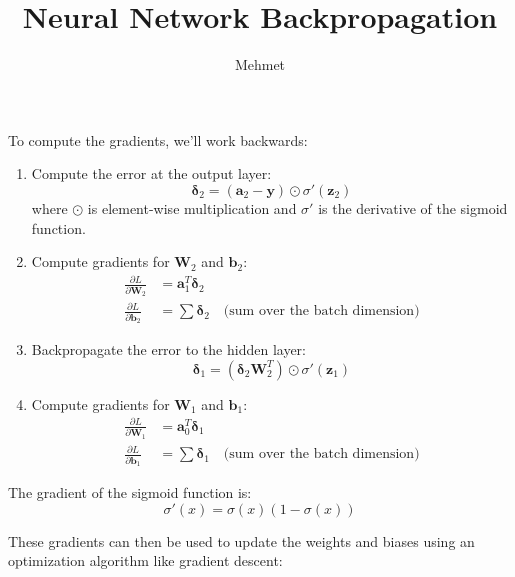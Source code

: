 \documentclass{article}
\title{Neural Network Backpropagation}
\author{Mehmet}
\date{}
\begin{document}
\maketitle

To compute the gradients, we'll work backwards:

\begin{enumerate}
    \item Compute the error at the output layer:
    \begin{equation*}
        \boldsymbol{\delta}_2 = (\mathbf{a}_2 - \mathbf{y}) \odot \sigma'(\mathbf{z}_2)
    \end{equation*}
    where $\odot$ is element-wise multiplication and $\sigma'$ is the derivative of the sigmoid function.

    \item Compute gradients for $\mathbf{W}_2$ and $\mathbf{b}_2$:
    \begin{align*}
        \frac{\partial L}{\partial \mathbf{W}_2} &= \mathbf{a}_1^T \boldsymbol{\delta}_2 \\
        \frac{\partial L}{\partial \mathbf{b}_2} &= \sum \boldsymbol{\delta}_2 \quad \text{(sum over the batch dimension)}
    \end{align*}

    \item Backpropagate the error to the hidden layer:
    \begin{equation*}
        \boldsymbol{\delta}_1 = (\boldsymbol{\delta}_2 \mathbf{W}_2^T) \odot \sigma'(\mathbf{z}_1)
    \end{equation*}

    \item Compute gradients for $\mathbf{W}_1$ and $\mathbf{b}_1$:
    \begin{align*}
        \frac{\partial L}{\partial \mathbf{W}_1} &= \mathbf{a}_0^T \boldsymbol{\delta}_1 \\
        \frac{\partial L}{\partial \mathbf{b}_1} &= \sum \boldsymbol{\delta}_1 \quad \text{(sum over the batch dimension)}
    \end{align*}
\end{enumerate}

The gradient of the sigmoid function is:
\begin{equation*}
    \sigma'(x) = \sigma(x) (1 - \sigma(x))
\end{equation*}

These gradients can then be used to update the weights and biases using an optimization algorithm like gradient descent:
\end{document}
